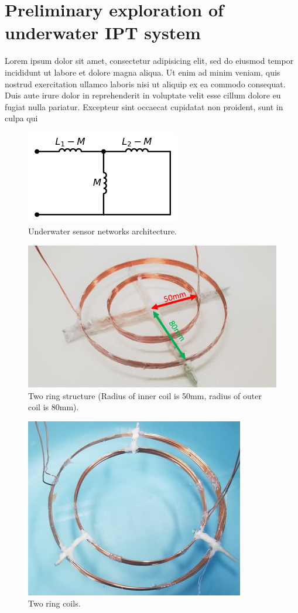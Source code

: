 \chapter{Preliminary exploration of underwater IPT system}
Lorem ipsum dolor sit amet, consectetur adipisicing elit,
sed do eiusmod tempor incididunt ut labore et dolore magna aliqua.
Ut enim ad minim veniam, quis nostrud exercitation ullamco laboris nisi ut aliquip ex ea commodo consequat.
Duis aute irure dolor in reprehenderit in voluptate velit esse cillum dolore eu fugiat nulla pariatur.
Excepteur sint occaecat cupidatat non proident, sunt in culpa qui



\begin{figure}[htbp]
    \centering
    \includegraphics[width=0.4\linewidth]{images/3_mutual_inductance.png}
    \caption{Underwater sensor networks architecture.}
    \label{fig:3_mutual_inductance}
\end{figure}

\begin{figure}[htbp]
    \centering
    \includegraphics[width=0.7\linewidth]{images/3_two_ring_coil_5cm_8cm.png}
    \caption{Two ring structure (Radius of inner coil is 50mm, radius of outer coil is 80mm).}
    \label{fig:3_two_ring_coil_5cm_8cm}
\end{figure}

\begin{figure}[htbp]
    \centering
    \includegraphics[width=0.5\linewidth]{images/3_two_ring_coil.png}
    \caption{Two ring coils.}
    \label{fig:3_two_ring_coil}
\end{figure}


